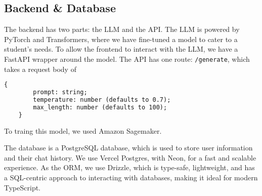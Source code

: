 \documentclass[9pt,a4paper,twocolumn,twoside]{tau-class/tau}
\begin{document}
\subsection{Backend \& Database}
The backend has two parts: the LLM and the API. The LLM is powered by PyTorch and Transformers, where we have fine-tuned a model to cater to a student's needs. To allow the frontend to interact with the LLM, we have a FastAPI wrapper around the model. The API has one route: \verb|/generate|, which takes a request body of \begin{lstlisting}[language=TeX, caption=Request Body for /generate]
	{
		prompt: string;
		temperature: number (defaults to 0.7);
		max_length: number (defaults to 100);
	}
\end{lstlisting} To traing this model, we used Amazon Sagemaker.

The database is a PostgreSQL database, which is used to store user information and their chat history. We use Vercel Postgres, with Neon, for a fast and scalable experience. As the ORM, we use Drizzle, which is type-safe, lightweight, and has a SQL-centric approach to interacting with databases, making it ideal for modern TypeScript.
\end{document}
